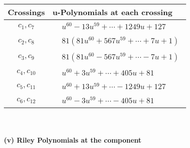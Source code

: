 \documentclass[1p]{elsarticle_modified}
\theoremstyle{definition}
\begin{document}
\begin{tabular}{m{50pt}|m{274pt}}
Crossings & \hspace{64pt}u-Polynomials at each crossing \\
\hline $$\begin{aligned}c_{1},c_{7}\end{aligned}$$&$\begin{aligned}
&u^{60}-13 u^{59}+\cdots+1249 u+127
\end{aligned}$\\
\hline $$\begin{aligned}c_{2},c_{8}\end{aligned}$$&$\begin{aligned}
&81(81 u^{60}+567 u^{59}+\cdots+7 u+1)
\end{aligned}$\\
\hline $$\begin{aligned}c_{3},c_{9}\end{aligned}$$&$\begin{aligned}
&81(81 u^{60}-567 u^{59}+\cdots-7 u+1)
\end{aligned}$\\
\hline $$\begin{aligned}c_{4},c_{10}\end{aligned}$$&$\begin{aligned}
&u^{60}+3 u^{59}+\cdots+405 u+81
\end{aligned}$\\
\hline $$\begin{aligned}c_{5},c_{11}\end{aligned}$$&$\begin{aligned}
&u^{60}+13 u^{59}+\cdots-1249 u+127
\end{aligned}$\\
\hline $$\begin{aligned}c_{6},c_{12}\end{aligned}$$&$\begin{aligned}
&u^{60}-3 u^{59}+\cdots-405 u+81
\end{aligned}$\\
\hline
\end{tabular}\\~\\
\newpage\renewcommand{\arraystretch}{1}
\flushleft \textbf{(v) Riley Polynomials at the component}\newline \\
\end{document}
